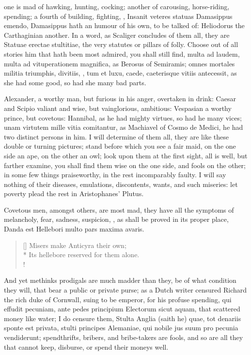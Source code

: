 {one is mad of hawking, hunting, cocking; another of carousing,
horse-riding, spending; a fourth of building, fighting, \etc{}, Insanit
veteres statuas Damasippus emendo, Damasippus hath an humour of his
own, to be talked of: Heliodorus the Carthaginian another. In a
word, as Scaliger concludes of them all, they are Statuae erectae
stultitiae, the very statutes or pillars of folly. Choose out of all
stories him that hath been most admired, you shall still find, multa ad
laudem, multa ad vituperationem magnifica, as Berosus of
Semiramis; omnes mortales militia triumphis, divitiis, \etc{}, tum et
luxu, caede, caeterisque vitiis antecessit, as she had some good, so
had she many bad parts.

Alexander, a worthy man, but furious in his anger, overtaken in drink:
Caesar and Scipio valiant and wise, but vainglorious, ambitious:
Vespasian a worthy prince, but covetous: Hannibal, as he had
mighty virtues, so had he many vices; unam virtutem mille vitia
comitantur, as Machiavel of Cosmo de Medici, he had two distinct
persons in him. I will determine of them all, they are like these
double or turning pictures; stand before which you see a fair maid, on
the one side an ape, on the other an owl; look upon them at the first
sight, all is well, but farther examine, you shall find them wise on
the one side, and fools on the other; in some few things praiseworthy,
in the rest incomparably faulty. I will say nothing of their diseases,
emulations, discontents, wants, and such miseries: let poverty plead
the rest in Aristophanes' Plutus.

Covetous men, amongst others, are most mad, they have all the
symptoms of melancholy, fear, sadness, suspicion, \etc{}, as shall be
proved in its proper place,
Danda est Hellebori multo pars maxima avaris.

\settowidth{\versewidth}{Its hellebore reserved for them alone.}
\begin{verse}[\versewidth]
Misers make Anticyra their own;\\*
Its hellebore reserved for them alone.\\!
\end{verse}

And yet methinks prodigals are much madder than they, be of what
condition they will, that bear a public or private purse; as a
Dutch writer censured Richard the rich duke of Cornwall, suing to
be emperor, for his profuse spending, qui effudit pecuniam, ante pedes
principium Electorum sicut aquam, that scattered money like water; I do
censure them, Stulta Anglia (saith he) quae, tot denariis sponte est
privata, stulti principes Alemaniae, qui nobile jus suum pro pecunia
vendiderunt; spendthrifts, bribers, and bribe-takers are fools, and so
are all they that cannot keep, disburse, or spend their moneys
well.

}
